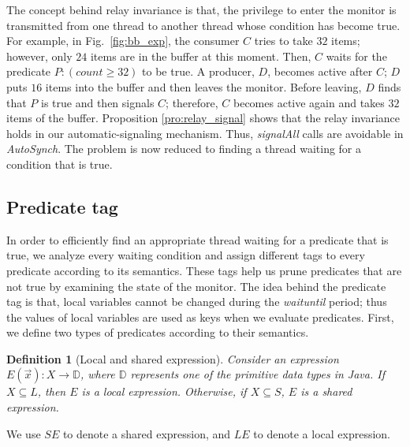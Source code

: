 \documentclass[preprint]{sigplanconf}
\newtheorem{definition}{Definition}
\begin{document}
The concept behind relay invariance is that, the privilege to enter the monitor
is transmitted from one thread to another thread whose condition has become true. 
For example, in Fig.~\ref{fig:bb_exp}, the consumer $C$ tries to take
$32$ items; however, only $24$ items are in the buffer at this moment. Then, $C$
waits for the predicate $P:  (count \ge 32)$ to be true. A producer, $D$, becomes 
active after 
$C$; $D$ puts $16$ items into the buffer and then leaves the monitor. Before 
leaving, $D$ finds that $P$ is true and then signals $C$; therefore, $C$ 
becomes active again and takes $32$ items of the buffer.
Proposition \ref{pro:relay_signal} shows that the relay
invariance holds in our automatic-signaling mechanism. 
Thus, {\em signalAll} calls are avoidable in {\em AutoSynch}. 
The problem is now reduced to finding a thread waiting for a condition that is 
true. 

\subsection{Predicate tag} \label{sec:tag}
In order to efficiently find an appropriate thread waiting for a predicate that is
true, we analyze every waiting condition and assign different tags 
to every predicate according to its semantics. These  tags
help us prune predicates that are not true by examining the state 
of the monitor. The idea behind the predicate tag is that, local variables cannot be
changed during the {\em waituntil} period; thus the values of local variables are
used as keys when we evaluate predicates. 
First, we define two types of 
predicates according to their semantics. 
\begin{definition}[Local and shared expression]
    Consider an expression $E(\vec{x}): X \rightarrow \mathbb{D}$, where
    $\mathbb{D}$ represents one of the primitive data types in Java. If $X
    \subseteq L$, then $E$ is a local expression. Otherwise, 
    if $X \subseteq S$, $E$ is a shared expression.  
\end{definition}
We use $SE$ to denote a shared expression, and $LE$ to denote a local 
expression.
\end{document}
